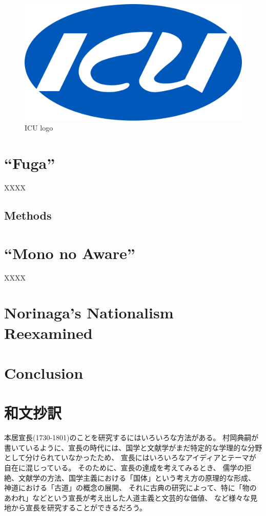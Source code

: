 \documentclass[12pt]{report}
\begin{document}
\begin{figure}[H]
    \begin{center}
    \includegraphics[width=\textwidth]{../figures/ICU_japan.png}
    \end{center}
    \caption{ICU logo}
    \label{1.1}
\end{figure}

\chapter{“Fuga”}
XXXX
\section{Methods}


\chapter{“Mono no Aware”}
XXXX

\chapter{Norinaga’s Nationalism Reexamined}

\chapter{Conclusion}





\chapter*{和文抄訳}
本居宣長(1730-1801)のことを研究するにはいろいろな方法がある。
村岡典嗣が書いているように、宣長の時代には、国学と文献学がまだ特定的な学理的な分野として分けられていなかったため、
宣長にはいろいろなアイディアとテーマが自在に混じっている。
そのために、宣長の達成を考えてみるとき、
儒学の拒絶、文献学の方法、国学主義における「国体」という考え方の原理的な形成、
神道における「古道」の概念の展開、
それに古典の研究によって、特に「物のあわれ」などという宣長が考え出した人道主義と文芸的な価値、
など様々な見地から宣長を研究することができるだろう。
\end{document}
